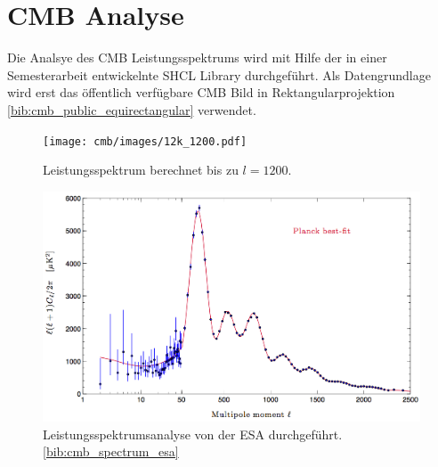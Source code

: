 \section{CMB Analyse}

Die Analsye des CMB Leistungsspektrums wird mit Hilfe der in einer 
Semesterarbeit entwickelnte SHCL Library durchgeführt. Als Datengrundlage wird 
erst das öffentlich verfügbare CMB Bild in Rektangularprojektion 
\ref{bib:cmb_public_equirectangular} verwendet.

\begin{figure}
	\centering
	\texttt{[image: cmb/images/12k\_1200.pdf]}
	\caption{Leistungsspektrum berechnet bis zu $l = 1200$.}
	\label{fig:cmb-power-spec-1200}
\end{figure}

\begin{figure}
	\centering
	\includegraphics[width=\linewidth]{cmb/images/mission_spectrum.png}
	\caption{Leistungsspektrumsanalyse von der ESA durchgeführt. 
	\ref{bib:cmb_spectrum_esa}}
	\label{fig:cmb-power-spec-1200}
\end{figure}